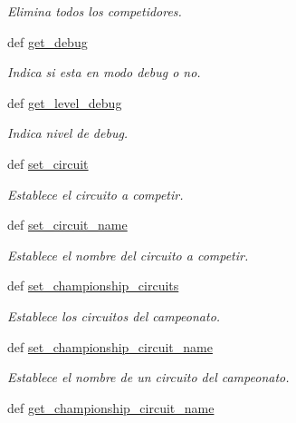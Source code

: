 \begin{DoxyCompactItemize}
\begin{DoxyCompactList}\small\item\em \-Elimina todos los competidores. \end{DoxyCompactList}\item 
def \hyperlink{classengine_1_1config_1_1Config_aa50b6545bf45b20e1d60cfa30c523cd4}{get\-\_\-debug}
\begin{DoxyCompactList}\small\item\em \-Indica si esta en modo debug o no. \end{DoxyCompactList}\item 
def \hyperlink{classengine_1_1config_1_1Config_a0ae5a4891ad4bb8a441a893e99d4301b}{get\-\_\-level\-\_\-debug}
\begin{DoxyCompactList}\small\item\em \-Indica nivel de debug. \end{DoxyCompactList}\item 
def \hyperlink{classengine_1_1config_1_1Config_a2dfcbc39a9518cb073cdf66ee3c91d73}{set\-\_\-circuit}
\begin{DoxyCompactList}\small\item\em \-Establece el circuito a competir. \end{DoxyCompactList}\item 
def \hyperlink{classengine_1_1config_1_1Config_a1572a824e31bce9de23fed2db58b82b9}{set\-\_\-circuit\-\_\-name}
\begin{DoxyCompactList}\small\item\em \-Establece el nombre del circuito a competir. \end{DoxyCompactList}\item 
def \hyperlink{classengine_1_1config_1_1Config_ae4cefc3c1c130b755785be839228ca5e}{set\-\_\-championship\-\_\-circuits}
\begin{DoxyCompactList}\small\item\em \-Establece los circuitos del campeonato. \end{DoxyCompactList}\item 
def \hyperlink{classengine_1_1config_1_1Config_adf04b9f384ecc724f81359b9055c640f}{set\-\_\-championship\-\_\-circuit\-\_\-name}
\begin{DoxyCompactList}\small\item\em \-Establece el nombre de un circuito del campeonato. \end{DoxyCompactList}\item 
def \hyperlink{classengine_1_1config_1_1Config_a5b958700e4e69ae04f08f3c487ed332d}{get\-\_\-championship\-\_\-circuit\-\_\-name}

\end{DoxyCompactItemize}
